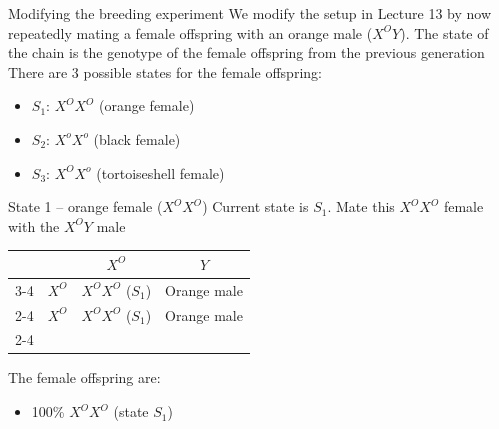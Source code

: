 \documentclass[aspectratio=169]{beamer}\usepackage[]{graphicx}\usepackage[]{xcolor}
\begin{document}
\begin{frame}{Modifying the breeding experiment}
    We modify the setup in Lecture 13 by now repeatedly mating a female offspring with an orange male ($X^O Y$).
    \vfill
    The state of the chain is the genotype of the female offspring from the previous generation
    \vfill
    There are 3 possible states for the female offspring:
    \begin{itemize}
        \item $S_1$: $X^O X^O$ (orange female)
        \item $S_2$: $X^o X^o$ (black female)
        \item $S_3$: $X^O X^o$ (tortoiseshell female)
    \end{itemize}
\end{frame}

\begin{frame}{State 1 -- orange female ($X^O X^O$)}
    Current state is $S_1$. Mate this $X^O X^O$ female with the $X^O Y$ male
    \vfill
    \begin{center}
          \renewcommand{\arraystretch}{1.5}
      \begin{tabular}{c c | c | c |}
      \multicolumn{2}{c}{} & \multicolumn{1}{c}{$X^O$} & \multicolumn{1}{c}{$Y$} \\ \cline{3-4}
      \multirow{2}{*}{\rotatebox{90}{Mother}} & $X^O$ & \cellcolor{punnettorange}$X^O X^O$ ($S_1$) & \cellcolor{punnettorange}Orange male \\ \cline{2-4}
      & $X^O$ & \cellcolor{punnettorange}$X^O X^O$ ($S_1$) & \cellcolor{punnettorange}Orange male \\ \cline{2-4}
      \end{tabular}
    \end{center}

    \vfill
    The female offspring are:
    \begin{itemize}
        \item 100\% $X^O X^O$ (state $S_1$)
    \end{itemize}
\end{frame}
\end{document}

